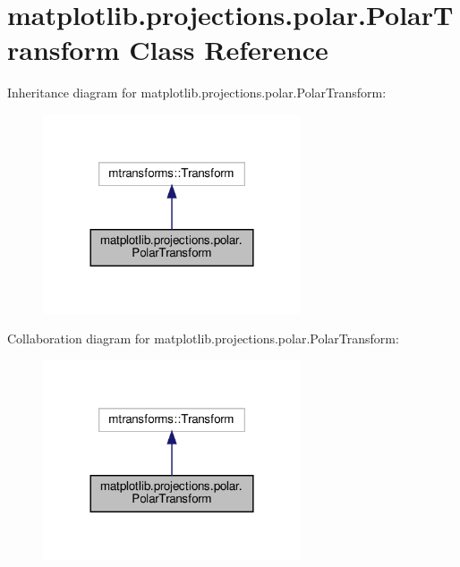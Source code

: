 \hypertarget{classmatplotlib_1_1projections_1_1polar_1_1PolarTransform}{}\section{matplotlib.\+projections.\+polar.\+Polar\+Transform Class Reference}
\label{classmatplotlib_1_1projections_1_1polar_1_1PolarTransform}


Inheritance diagram for matplotlib.\+projections.\+polar.\+Polar\+Transform\+:
\nopagebreak
\begin{figure}[H]
\begin{center}
\leavevmode
\includegraphics[width=216pt]{classmatplotlib_1_1projections_1_1polar_1_1PolarTransform__inherit__graph}
\end{center}
\end{figure}


Collaboration diagram for matplotlib.\+projections.\+polar.\+Polar\+Transform\+:
\nopagebreak
\begin{figure}[H]
\begin{center}
\leavevmode
\includegraphics[width=216pt]{classmatplotlib_1_1projections_1_1polar_1_1PolarTransform__coll__graph}
\end{center}
\end{figure}

